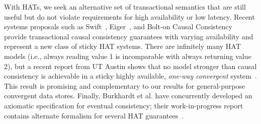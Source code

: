 With HATs, we seek an alternative set of transactional semantics that
are still useful but do not violate requirements for high availability
or low latency. Recent systems proposals such as Swift~\cite{swift},
Eiger~\cite{eiger}, and Bolt-on Causal Consistency~\cite{bolton}
provide transactional causal consistency guarantees with varying
availability and represent a new class of sticky HAT systems. There
are infinitely many HAT models (i.e., always reading value 1 is
incomparable with always returning value 2), but a recent report from
UT Austin shows that no model stronger than causal consistency is
achievable in a sticky highly available, \textit{one-way convergent}
system~\cite{cac}. This result is promising and complementary to our
results for general-purpose convergent data stores. Finally, Burkhardt
et al. have concurrently developed an axiomatic specification for
eventual consistency; their work-in-progress report contains alternate
formalism for several HAT guarantees~\cite{burkhardt-txns}.






